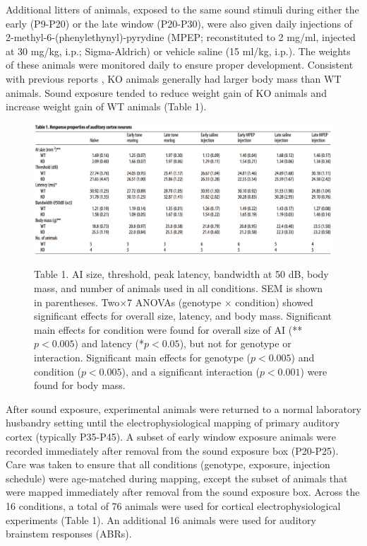Additional litters of animals, exposed to the same sound stimuli during either the early (P9-P20) or the late window (P20-P30), were also given daily injections of 2-methyl-6-(phenylethynyl)-pyrydine (MPEP; reconstituted to 2 mg/ml, injected at 30 mg/kg, i.p.; Sigma-Aldrich) or vehicle saline (15 ml/kg, i.p.). The weights of these animals were monitored daily to ensure proper development. Consistent with previous reports \cite{Moy2009}, KO animals generally had larger body mass than WT animals. Sound exposure tended to reduce weight gain of KO animals and increase weight gain of WT animals (Table 1).

\begin{figure}
	\centering
		\includegraphics[width=7in]{images/C2T1}
	\begin{changemargin}{1in}{1in}
	\footnotesize{Table 1. AI size, threshold, peak latency, bandwidth at 50 dB, body mass, and number of animals used in all conditions. SEM is shown in parentheses. Two$\times$7 ANOVAs (genotype $\times$ condition) showed significant effects for overall size, latency, and body mass. Significant main effects for condition were found for overall size of AI (**$p<0.005$) and latency (*$p<0.05$), but not for genotype or interaction. Significant main effects for genotype ($p<0.005$) and condition ($p<0.005$), and a significant interaction ($p<0.001$) were found for body mass.}
	\end{changemargin}
\end{figure}

After sound exposure, experimental animals were returned to a normal laboratory husbandry setting until the electrophysiological mapping of primary auditory cortex (typically P35-P45). A subset of early window exposure animals were recorded immediately after removal from the sound exposure box (P20-P25). Care was taken to ensure that all conditions (genotype, exposure, injection schedule) were age-matched during mapping, except the subset of animals that were mapped immediately after removal from the sound exposure box. Across the 16 conditions, a total of 76 animals were used for cortical electrophysiological experiments (Table 1). An additional 16 animals were used for auditory brainstem responses (ABRs).

